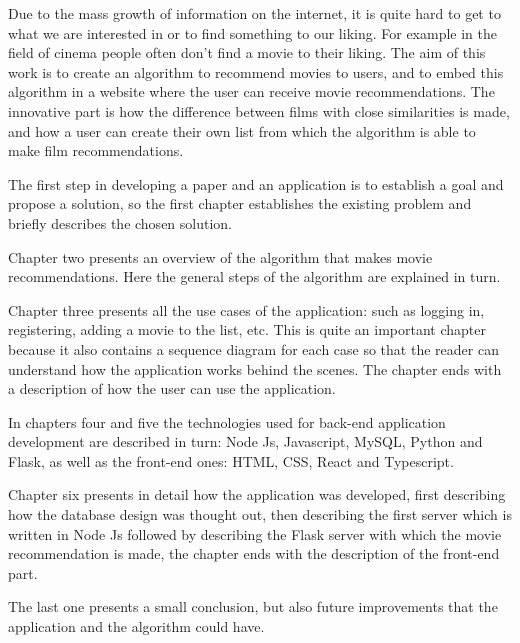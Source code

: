 \par Due to the mass growth of information on the internet, it is quite hard to get to what we are interested in or to find something to our liking. For example in the field of cinema people often don't find a movie to their liking. The aim of this work is to create an algorithm to recommend movies to users, and to embed this algorithm in a website where the user can receive movie recommendations. The innovative part is how the difference between films with close similarities is made, and how a user can create their own list from which the algorithm is able to make film recommendations.
\par The first step in developing a paper and an application is to establish a goal and propose a solution, so the first chapter establishes the existing problem and briefly describes the chosen solution.
\par Chapter two presents an overview of the algorithm that makes movie recommendations. Here the general steps of the algorithm are explained in turn.
\par Chapter three presents all the use cases of the application: such as logging in, registering, adding a movie to the list, etc. This is quite an important chapter because it also contains a sequence diagram for each case so that the reader can understand how the application works behind the scenes. The chapter ends with a description of how the user can use the application.
\par In chapters four and five the technologies used for back-end application development are described in turn: Node Js, Javascript, MySQL, Python and Flask, as well as the front-end ones: HTML, CSS, React and Typescript.
\par Chapter six presents in detail how the application was developed, first describing how the database design was thought out, then describing the first server which is written in Node Js followed by describing the Flask server with which the movie recommendation is made, the chapter ends with the description of the front-end part.
\par The last one presents a small conclusion, but also future improvements that the application and the algorithm could have.